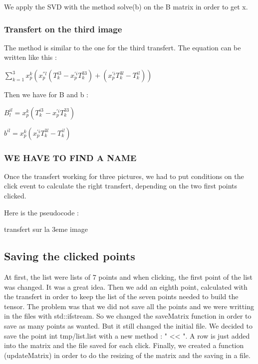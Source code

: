 \documentclass{report}
\begin{document}
We apply the SVD with the method solve(b) on the B matrix in order to get x. 

\subsubsection{Transfert on the third image}
The method is similar to the one for the third transfert.
The equation can be written like this : 

\begin{center}
 $ \displaystyle { \sum_{k = 1}^{3}} x_{p}^{k}(x_{p}^{''l}(T_{k}^{i3} - x_{p}^{'i}T_{k}^{33}) + ( x_{p}^{'i}T_{k}^{3l} - T_{k}^{il}))$ 
\end{center}

Then we have for B and b :  
\begin{center}
$B_{l}^{il} = x_{p}^{k}(T_{k}^{i3} - x_{p}^{'i}T_{k}^{33})$
\end{center}
\begin{center}
$b^{il} = x_{p}^{k}(x_{p}^{'i}T_{k}^{3l} - T_{k}^{il})$
\end{center}

\subsubsection{WE HAVE TO FIND A NAME}
Once the transfert working for three pictures, we had to put conditions on the click event to calculate the right transfert, depending on the two first points clicked.  

Here is the pseudocode : 
\begin{algorithm}
\SetLine
\caption{transfert sur la 3eme image}
\SetLine
{}
\end{algorithm}
\subsection{Saving the clicked points}
At first, the list were lists of 7 points and when clicking, the first point of the list was changed. It was a great idea. 
Then we add an eighth point, calculated with the transfert in order to keep the list of the seven points needed to build the tensor. The problem was that we did not save all the points and we were writting in the files with std::ifstream. So we changed the saveMatrix function in order to save as many points as wanted. But it still changed the initial file. 
We decided to save the point int tmp/list.list with a new method : " << ". A row is just added into the matrix and the file saved for each click. 
Finally, we created a function (updateMatrix) in order to do the resizing of the matrix and the saving in a file. 
\end{document}
